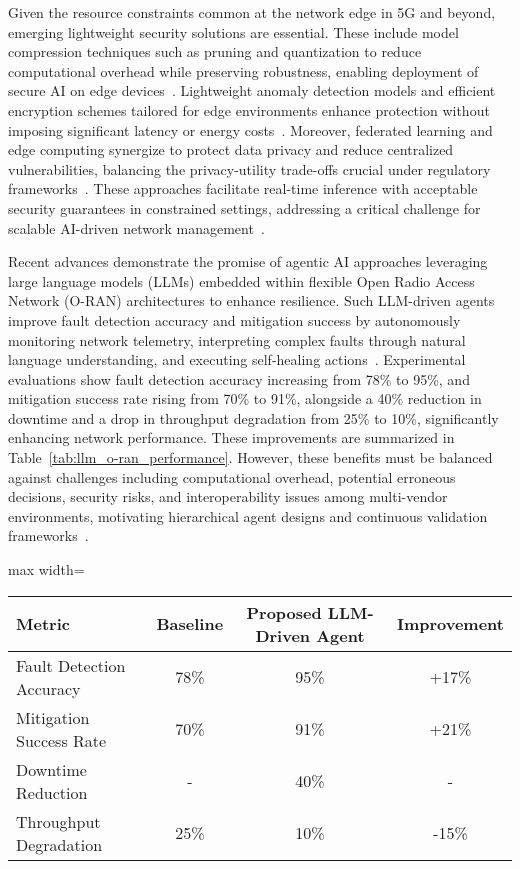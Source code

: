 \documentclass[sigconf]{acmart}
\begin{document}
Given the resource constraints common at the network edge in 5G and beyond, emerging lightweight security solutions are essential. These include model compression techniques such as pruning and quantization to reduce computational overhead while preserving robustness, enabling deployment of secure AI on edge devices~\cite{ref48,ref50}. Lightweight anomaly detection models and efficient encryption schemes tailored for edge environments enhance protection without imposing significant latency or energy costs~\cite{ref50}. Moreover, federated learning and edge computing synergize to protect data privacy and reduce centralized vulnerabilities, balancing the privacy-utility trade-offs crucial under regulatory frameworks~\cite{ref48}. These approaches facilitate real-time inference with acceptable security guarantees in constrained settings, addressing a critical challenge for scalable AI-driven network management~\cite{ref50}.

Recent advances demonstrate the promise of agentic AI approaches leveraging large language models (LLMs) embedded within flexible Open Radio Access Network (O-RAN) architectures to enhance resilience. Such LLM-driven agents improve fault detection accuracy and mitigation success by autonomously monitoring network telemetry, interpreting complex faults through natural language understanding, and executing self-healing actions~\cite{ref55}. Experimental evaluations show fault detection accuracy increasing from 78\% to 95\%, and mitigation success rate rising from 70\% to 91\%, alongside a 40\% reduction in downtime and a drop in throughput degradation from 25\% to 10\%, significantly enhancing network performance. These improvements are summarized in Table~\ref{tab:llm_o-ran_performance}. However, these benefits must be balanced against challenges including computational overhead, potential erroneous decisions, security risks, and interoperability issues among multi-vendor environments, motivating hierarchical agent designs and continuous validation frameworks~\cite{ref55}.

\begin{table*}[htbp]
\centering
\caption{Performance Improvements of LLM-Driven Agentic AI in O-RAN Resilience~\cite{ref55}}
\label{tab:llm_o-ran_performance}
\begin{adjustbox}{max width=\textwidth}
\begin{tabular}{@{}lccc@{}}
\toprule
Metric & Baseline & Proposed LLM-Driven Agent & Improvement \\
\midrule
Fault Detection Accuracy & 78\% & 95\% & +17\% \\
Mitigation Success Rate & 70\% & 91\% & +21\% \\
Downtime Reduction & - & 40\% & - \\
Throughput Degradation & 25\% & 10\% & -15\% \\
\bottomrule
\end{tabular}
\end{adjustbox}
\end{table*}
\end{document}

